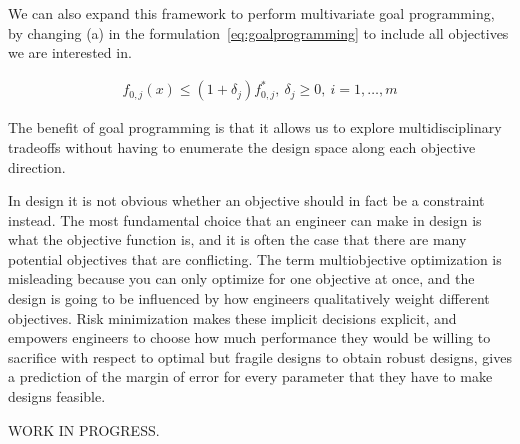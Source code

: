 We can also expand this framework to perform multivariate goal programming,
by changing (a) in the formulation~\ref{eq:goalprogramming} to include all
objectives we are interested in.

\begin{align*}
    f_{0,j}(x) \leq (1+\delta_j) f^*_{0,j},~\delta_j \geq 0,~i = 1,\ldots, m
    \label{eq:multigoal}
\end{align*}

The benefit of goal programming is that it allows us to explore multidisciplinary tradeoffs without
having to enumerate the design space along each objective direction.

In design it is not obvious whether an objective should in fact be a constraint instead. The most
fundamental choice that an engineer can make in design is what the objective function is, and it is
often the case that there are many potential objectives that are conflicting. The term multiobjective optimization is misleading
because you can only optimize for one objective at once,
and the design is going to be influenced by how engineers qualitatively weight different objectives.
Risk minimization makes these implicit decisions explicit, and empowers engineers to choose
how much performance they would be willing to sacrifice with respect
to optimal but fragile designs to obtain robust designs, gives a prediction of the margin of error
for every parameter that they have to make designs feasible.

WORK IN PROGRESS.

